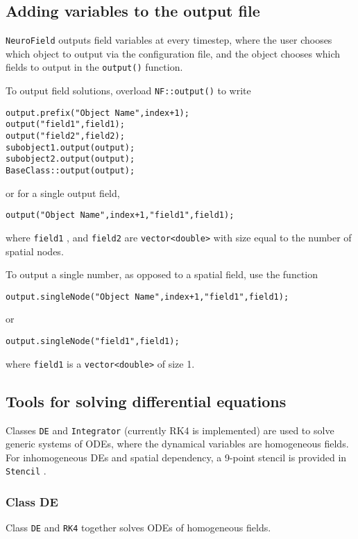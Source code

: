 \documentclass[12pt,a4paper]{article}
\newcommand{\type}[1]{ {\small\small\tt #1} }
\newcommand{\NF}[0]{ \type{NeuroField}}
\begin{document}
\subsection{Adding variables to the output file}
\label{sec:output}

\NF outputs field variables at every timestep, where the user chooses which object to output via the configuration file, and the object chooses which fields to output in the \type{output()} function.

To output field solutions, overload \type{NF::output()} to write
\begin{lstlisting}
output.prefix("Object Name",index+1);
output("field1",field1);
output("field2",field2);
subobject1.output(output);
subobject2.output(output);
BaseClass::output(output);
\end{lstlisting}
or for a single output field,
\begin{lstlisting}
output("Object Name",index+1,"field1",field1);
\end{lstlisting}

where \type{field1}, and \type{field2} are \type{vector<double>} with size equal to the number of spatial nodes.

To output a single number, as opposed to a spatial field, use the function
\begin{lstlisting}
output.singleNode("Object Name",index+1,"field1",field1);
\end{lstlisting}
or
\begin{lstlisting}
output.singleNode("field1",field1);
\end{lstlisting}
where \type{field1} is a \type{vector<double>} of size 1.

\subsection{Tools for solving differential equations}
\label{sec:diffeqn}

Classes \type{DE} and \type{Integrator} (currently RK4 is implemented) are used to solve generic systems of ODEs, where the dynamical variables are homogeneous fields. For inhomogeneous DEs and spatial dependency, a 9-point stencil is provided in \type{Stencil}.

\subsubsection{Class DE}
\label{sec:de}

Class \type{DE} and \type{RK4} together solves ODEs of homogeneous fields.
\end{document}
